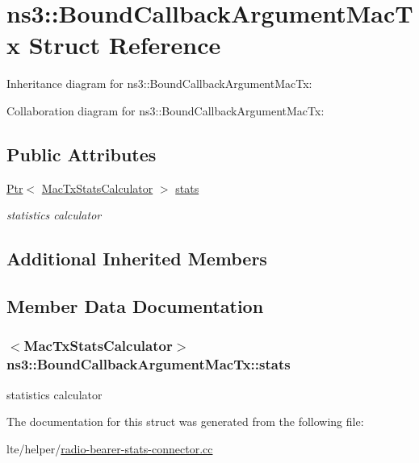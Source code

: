 \hypertarget{structns3_1_1BoundCallbackArgumentMacTx}{}\section{ns3\+:\+:Bound\+Callback\+Argument\+Mac\+Tx Struct Reference}
\label{structns3_1_1BoundCallbackArgumentMacTx}


Inheritance diagram for ns3\+:\+:Bound\+Callback\+Argument\+Mac\+Tx\+:


Collaboration diagram for ns3\+:\+:Bound\+Callback\+Argument\+Mac\+Tx\+:
\subsection*{Public Attributes}
\begin{DoxyCompactItemize}
\item 
\hyperlink{classns3_1_1Ptr}{Ptr}$<$ \hyperlink{classns3_1_1MacTxStatsCalculator}{Mac\+Tx\+Stats\+Calculator} $>$ \hyperlink{structns3_1_1BoundCallbackArgumentMacTx_a3f8f95fe582ed31ba408bce60b581ed4}{stats}
\begin{DoxyCompactList}\small\item\em statistics calculator \end{DoxyCompactList}\end{DoxyCompactItemize}
\subsection*{Additional Inherited Members}


\subsection{Member Data Documentation}
\subsubsection[{\texorpdfstring{stats}{stats}}]{$<${\bf Mac\+Tx\+Stats\+Calculator}$>$ ns3\+::\+Bound\+Callback\+Argument\+Mac\+Tx\+::stats}\hypertarget{structns3_1_1BoundCallbackArgumentMacTx_a3f8f95fe582ed31ba408bce60b581ed4}{}\label{structns3_1_1BoundCallbackArgumentMacTx_a3f8f95fe582ed31ba408bce60b581ed4}


statistics calculator 



The documentation for this struct was generated from the following file\+:\begin{DoxyCompactItemize}
\item 
lte/helper/\hyperlink{radio-bearer-stats-connector_8cc}{radio-\/bearer-\/stats-\/connector.\+cc}\end{DoxyCompactItemize}
